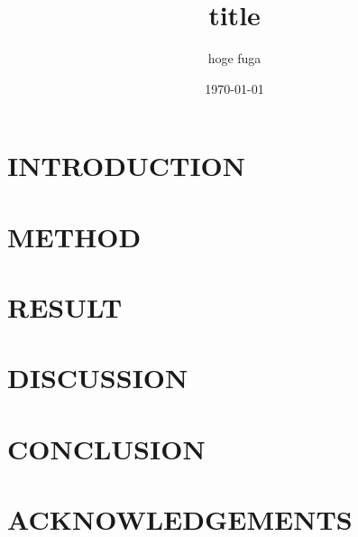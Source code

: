 \documentclass[dvipdfmx,uplatex,openany]{jsarticle}
\begin{document}
\title{title}
\author{hoge fuga}
\date{\today}
\maketitle

\section{INTRODUCTION}
\section{METHOD}
\section{RESULT}
\section{DISCUSSION}
\section{CONCLUSION}
\section{ACKNOWLEDGEMENTS}
\end{document}

